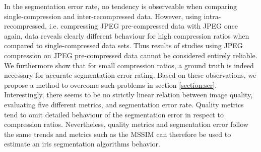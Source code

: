 \documentclass[10pt,twocolumn,letterpaper]{article}
\begin{document}
In the segmentation error rate, no tendency is observeable when comparing single-compression and inter-recompressed data. However, using intra-recompressed, i.e. compressing JPEG pre-compressed data with JPEG once again, data reveals clearly different behaviour for high compression ratios when compared to single-compressed data sets. Thus results of studies using JPEG compression on JPEG pre-compressed data cannot be considered entirely reliable. We furthermore show that for small compression ratios, a ground truth is indeed necessary for accurate segmentation error rating. Based on these observations, we propose a method to overcome such problems in section \ref{section:ser}. Interestingly, there seems to be no strictly linear relation between image quality, evaluating five different metrics, and segmentation error rate. Quality metrics tend to omit detailed behaviour of the segmentation error in respect to compression ratios. Nevertheless, quality metrics and segmentation error follow the same trends and metrics such as the MSSIM can therefore be used to estimate an iris segmentation algorithms behavior.           


{\small


}
\end{document}
